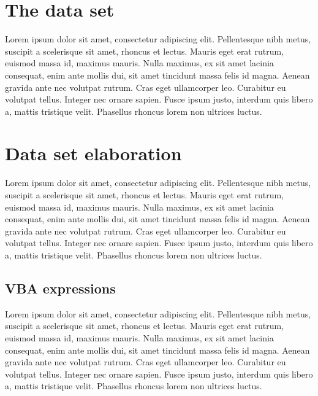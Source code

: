 
\section{The data set}\label{sec:dataset}
Lorem ipsum dolor sit amet, consectetur adipiscing elit. Pellentesque nibh metus, suscipit a scelerisque sit amet, rhoncus et lectus. Mauris eget erat rutrum, euismod massa id, maximus mauris. Nulla maximus, ex sit amet lacinia consequat, enim ante mollis dui, sit amet tincidunt massa felis id magna. Aenean gravida ante nec volutpat rutrum. Cras eget ullamcorper leo. Curabitur eu volutpat tellus. Integer nec ornare sapien. Fusce ipsum justo, interdum quis libero a, mattis tristique velit. Phasellus rhoncus lorem non ultrices luctus.


\section{Data set elaboration}\label{sec:datasetelaboration}
Lorem ipsum dolor sit amet, consectetur adipiscing elit. Pellentesque nibh metus, suscipit a scelerisque sit amet, rhoncus et lectus. Mauris eget erat rutrum, euismod massa id, maximus mauris. Nulla maximus, ex sit amet lacinia consequat, enim ante mollis dui, sit amet tincidunt massa felis id magna. Aenean gravida ante nec volutpat rutrum. Cras eget ullamcorper leo. Curabitur eu volutpat tellus. Integer nec ornare sapien. Fusce ipsum justo, interdum quis libero a, mattis tristique velit. Phasellus rhoncus lorem non ultrices luctus.


\subsection{VBA expressions}\label{sub:vbaexpressions}
Lorem ipsum dolor sit amet, consectetur adipiscing elit. Pellentesque nibh metus, suscipit a scelerisque sit amet, rhoncus et lectus. Mauris eget erat rutrum, euismod massa id, maximus mauris. Nulla maximus, ex sit amet lacinia consequat, enim ante mollis dui, sit amet tincidunt massa felis id magna. Aenean gravida ante nec volutpat rutrum. Cras eget ullamcorper leo. Curabitur eu volutpat tellus. Integer nec ornare sapien. Fusce ipsum justo, interdum quis libero a, mattis tristique velit. Phasellus rhoncus lorem non ultrices luctus.

